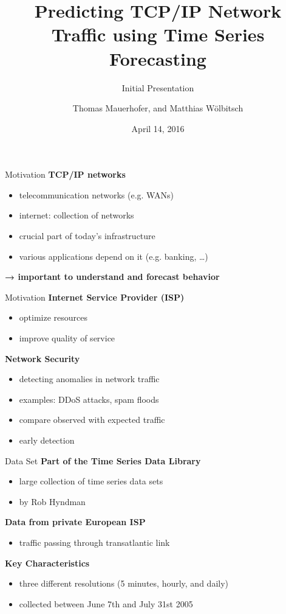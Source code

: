 \documentclass{beamer}
\title{Predicting TCP/IP Network Traffic using Time Series Forecasting}
\subtitle{Initial Presentation}
\date{April 14, 2016}
\author{Thomas Mauerhofer, and Matthias Wölbitsch}
\begin{document}
  \maketitle
  
  \begin{frame}{Motivation}   
    \textbf{TCP/IP networks} 
    \begin{itemize}
      \item telecommunication networks (e.g. WANs)
      \item internet: collection of networks 
      \item crucial part of today's infrastructure  
      \item various applications depend on it (e.g. banking, \ldots)
    \end{itemize}
    
    \hspace{10pt}
    
    \textbf{→ important to understand and forecast behavior}
  \end{frame}
  
  \begin{frame}{Motivation}
    \textbf{Internet Service Provider (ISP)}
    \begin{itemize}
     \item optimize resources
     \item improve quality of service
    \end{itemize}
    
    \textbf{Network Security}
    \begin{itemize}
     \item detecting anomalies in network traffic
     \item examples: DDoS attacks, spam floods
     \item compare observed with expected traffic
     \item early detection
    \end{itemize}    
  \end{frame}

  \begin{frame}{Data Set}
    \textbf{Part of the Time Series Data Library}
    \begin{itemize}
     \item large collection of time series data sets
     \item by Rob Hyndman
    \end{itemize}

    \textbf{Data from private European ISP}
    \begin{itemize}
     \item traffic passing through transatlantic link
    \end{itemize}

    \textbf{Key Characteristics}
    \begin{itemize}
     \item three different resolutions (5 minutes, hourly, and daily)
     \item collected between June 7th and July 31st 2005
    \end{itemize}
  \end{frame}
\end{document}
